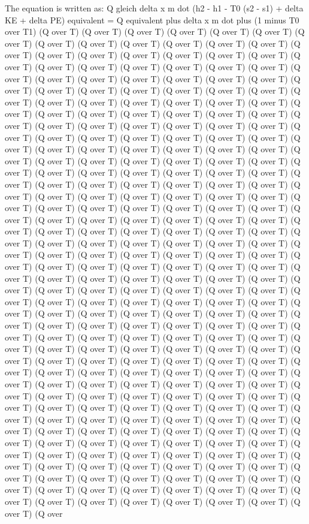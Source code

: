 The equation is written as: 
Q gleich delta x m dot (h2 - h1 - T0 (s2 - s1) + delta KE + delta PE)
equivalent = Q equivalent plus delta x m dot plus (1 minus T0 over T1) (Q over T) (Q over T) (Q over T) (Q over T) (Q over T) (Q over T) (Q over T) (Q over T) (Q over T) (Q over T) (Q over T) (Q over T) (Q over T) (Q over T) (Q over T) (Q over T) (Q over T) (Q over T) (Q over T) (Q over T) (Q over T) (Q over T) (Q over T) (Q over T) (Q over T) (Q over T) (Q over T) (Q over T) (Q over T) (Q over T) (Q over T) (Q over T) (Q over T) (Q over T) (Q over T) (Q over T) (Q over T) (Q over T) (Q over T) (Q over T) (Q over T) (Q over T) (Q over T) (Q over T) (Q over T) (Q over T) (Q over T) (Q over T) (Q over T) (Q over T) (Q over T) (Q over T) (Q over T) (Q over T) (Q over T) (Q over T) (Q over T) (Q over T) (Q over T) (Q over T) (Q over T) (Q over T) (Q over T) (Q over T) (Q over T) (Q over T) (Q over T) (Q over T) (Q over T) (Q over T) (Q over T) (Q over T) (Q over T) (Q over T) (Q over T) (Q over T) (Q over T) (Q over T) (Q over T) (Q over T) (Q over T) (Q over T) (Q over T) (Q over T) (Q over T) (Q over T) (Q over T) (Q over T) (Q over T) (Q over T) (Q over T) (Q over T) (Q over T) (Q over T) (Q over T) (Q over T) (Q over T) (Q over T) (Q over T) (Q over T) (Q over T) (Q over T) (Q over T) (Q over T) (Q over T) (Q over T) (Q over T) (Q over T) (Q over T) (Q over T) (Q over T) (Q over T) (Q over T) (Q over T) (Q over T) (Q over T) (Q over T) (Q over T) (Q over T) (Q over T) (Q over T) (Q over T) (Q over T) (Q over T) (Q over T) (Q over T) (Q over T) (Q over T) (Q over T) (Q over T) (Q over T) (Q over T) (Q over T) (Q over T) (Q over T) (Q over T) (Q over T) (Q over T) (Q over T) (Q over T) (Q over T) (Q over T) (Q over T) (Q over T) (Q over T) (Q over T) (Q over T) (Q over T) (Q over T) (Q over T) (Q over T) (Q over T) (Q over T) (Q over T) (Q over T) (Q over T) (Q over T) (Q over T) (Q over T) (Q over T) (Q over T) (Q over T) (Q over T) (Q over T) (Q over T) (Q over T) (Q over T) (Q over T) (Q over T) (Q over T) (Q over T) (Q over T) (Q over T) (Q over T) (Q over T) (Q over T) (Q over T) (Q over T) (Q over T) (Q over T) (Q over T) (Q over T) (Q over T) (Q over T) (Q over T) (Q over T) (Q over T) (Q over T) (Q over T) (Q over T) (Q over T) (Q over T) (Q over T) (Q over T) (Q over T) (Q over T) (Q over T) (Q over T) (Q over T) (Q over T) (Q over T) (Q over T) (Q over T) (Q over T) (Q over T) (Q over T) (Q over T) (Q over T) (Q over T) (Q over T) (Q over T) (Q over T) (Q over T) (Q over T) (Q over T) (Q over T) (Q over T) (Q over T) (Q over T) (Q over T) (Q over T) (Q over T) (Q over T) (Q over T) (Q over T) (Q over T) (Q over T) (Q over T) (Q over T) (Q over T) (Q over T) (Q over T) (Q over T) (Q over T) (Q over T) (Q over T) (Q over T) (Q over T) (Q over T) (Q over T) (Q over T) (Q over T) (Q over T) (Q over T) (Q over T) (Q over T) (Q over T) (Q over T) (Q over T) (Q over T) (Q over T) (Q over T) (Q over T) (Q over T) (Q over T) (Q over T) (Q over T) (Q over T) (Q over T) (Q over T) (Q over T) (Q over T) (Q over T) (Q over T) (Q over T) (Q over T) (Q over T) (Q over T) (Q over T) (Q over T) (Q over T) (Q over T) (Q over T) (Q over T) (Q over T) (Q over T) (Q over T) (Q over T) (Q over T) (Q over T) (Q over T) (Q over T) (Q over T) (Q over T) (Q over T) (Q over T) (Q over T) (Q over 